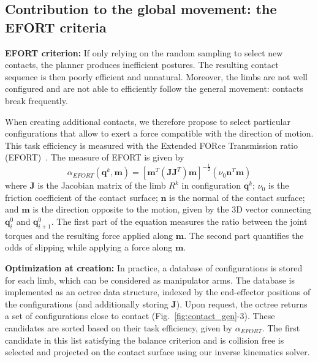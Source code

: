 \subsection{Contribution to the global movement: the EFORT criteria}
\noindent\textbf{EFORT criterion:} If only relying on the random sampling to select new contacts, the planner produces inefficient postures. The resulting contact sequence is then poorly efficient and unnatural. Moreover, the limbs are not well configured and are not able to efficiently follow the general movement: contacts break frequently.

When creating additional contacts, we therefore propose to select particular configurations that allow to exert a force compatible with the direction of motion. This task efficiency is measured  with the Extended FORce Transmission ratio (EFORT)~\cite{Tonneau2014}.
%
The measure of EFORT is given by
\begin{equation}
\alpha_{EFORT}(\mathbf{q}^k, \mathbf{m}) = [\mathbf{m}^{T}(\mathbf{J}\mathbf{J}^T)\mathbf{m}]^{-\frac{1}{2}} ( \nu_0 \mathbf{n}^T \mathbf{m})
\end{equation}
where $\mathbf{J}$ is the Jacobian matrix of the limb $R^k$ in configuration $\mathbf{q}^k$; $\nu_0$ is the friction coefficient of the contact surface; $\mathbf{n}$ is the normal of the contact surface; and $\mathbf{m}$ is the direction opposite to the motion,
given by the 3D vector connecting $\mathbf{q}_{i}^0$ and $\mathbf{q}_{i+1}^0$.
%
The first part of the equation measures the ratio between the joint  torques and the resulting force applied along $\mathbf{m}$. The second part quantifies the odds of slipping while applying a force along $\mathbf{m}$. 

\noindent\textbf{Optimization at creation:} In practice, a database of configurations is stored for each limb, which can be considered as manipulator arms. The database is implemented  as an octree data structure, indexed by the end-effector positions of the configurations (and additionally storing $\mathbf{J}$). 
Upon request, the octree returns a set of configurations close to contact (Fig.~\ref{fig:contact_gen}-3). These candidates are sorted based on their task efficiency, given by $\alpha_{EFORT}$. The first candidate in this list satisfying the balance criterion and is collision free is selected and projected on the contact surface using our inverse kinematics solver.



